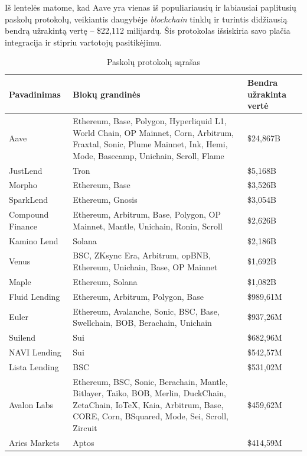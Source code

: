 \documentclass[]{VUMIFTemplateClass}
\begin{document}
Iš lentelės matome, kad Aave yra vienas iš populiariausių ir labiausiai paplitusių paskolų protokolų, veikiantis daugybėje \textit{blockchain} tinklų ir turintis didžiausią bendrą užrakintą vertę – \$22,112 milijardų. Šis protokolas išsiskiria savo plačia integracija ir stipriu vartotojų pasitikėjimu.

\begin{table}[H]
  \centering
  \caption{Paskolų protokolų sąrašas \cite{LikvidacijuProtokolai}}
  \begin{tabular}{|l|p{7cm}|p{5cm}|}
  \hline
  \textbf{Pavadinimas} & \textbf{Blokų grandinės} & \textbf{Bendra užrakinta vertė} \\ \hline
  Aave                      & Ethereum, Base, Polygon, Hyperliquid L1, World Chain, OP Mainnet, Corn, Arbitrum, Fraxtal, Sonic, Plume Mainnet, Ink, Hemi, Mode, Basecamp, Unichain, Scroll, Flame & \$24,867B \\ \hline
  JustLend                  & Tron                                                & \$5,168B  \\ \hline
  Morpho                    & Ethereum, Base                                      & \$3,526B  \\ \hline
  SparkLend                 & Ethereum, Gnosis                                    & \$3,054B  \\ \hline
  Compound Finance          & Ethereum, Arbitrum, Base, Polygon, OP Mainnet, Mantle, Unichain, Ronin, Scroll & \$2,626B  \\ \hline
  Kamino Lend               & Solana                                              & \$2,186B  \\ \hline
  Venus                     & BSC, ZKsync Era, Arbitrum, opBNB, Ethereum, Unichain, Base, OP Mainnet          & \$1,692B  \\ \hline
  Maple                     & Ethereum, Solana          & \$1,082B  \\ \hline
  Fluid Lending             & Ethereum, Arbitrum, Polygon, Base                            & \$989,61M \\ \hline
  Euler                     & Ethereum, Avalanche, Sonic, BSC, Base, Swellchain, BOB, Berachain, Unichain          & \$937,26M  \\ \hline
  Suilend                   & Sui                                                 & \$682,96M \\ \hline
  NAVI Lending              & Sui                                                 & \$542,57M \\ \hline
  Lista Lending                     & BSC          & \$531,02M  \\ \hline
  Avalon Labs               & Ethereum, BSC, Sonic, Berachain, Mantle, Bitlayer, Taiko, BOB, Merlin, DuckChain, ZetaChain, IoTeX, Kaia, Arbitrum, Base, CORE, Corn, BSquared, Mode, Sei, Scroll, Zircuit & \$459,62M  \\ \hline
  Aries Markets                     & Aptos          & \$414,59M  \\ \hline
  \end{tabular}
  \label{tab:sample_table}
\end{table}
\end{document}
